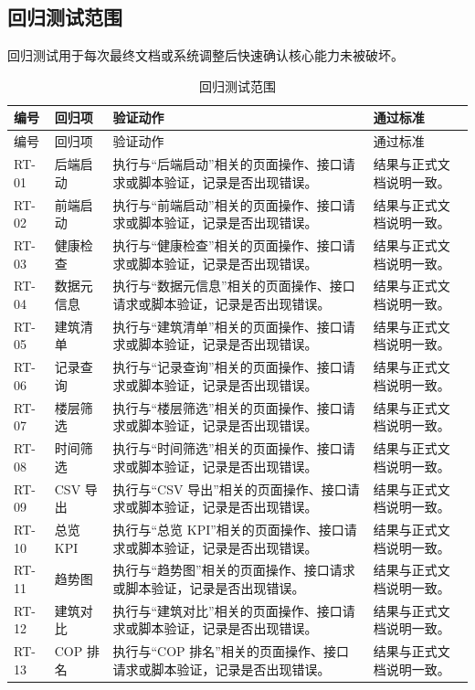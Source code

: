 \documentclass[12pt,a4paper]{ctexart}
\begin{document}
\subsection{回归测试范围}
回归测试用于每次最终文档或系统调整后快速确认核心能力未被破坏。
\begin{longtable}{L{1.8cm}L{3.2cm}L{6.4cm}L{4.0cm}}
\caption{回归测试范围}\\
\toprule
编号 & 回归项 & 验证动作 & 通过标准 \\
\midrule
\endfirsthead
\toprule
编号 & 回归项 & 验证动作 & 通过标准 \\
\midrule
\endhead
RT-01 & 后端启动 & 执行与“后端启动”相关的页面操作、接口请求或脚本验证，记录是否出现错误。 & 结果与正式文档说明一致。 \\
RT-02 & 前端启动 & 执行与“前端启动”相关的页面操作、接口请求或脚本验证，记录是否出现错误。 & 结果与正式文档说明一致。 \\
RT-03 & 健康检查 & 执行与“健康检查”相关的页面操作、接口请求或脚本验证，记录是否出现错误。 & 结果与正式文档说明一致。 \\
RT-04 & 数据元信息 & 执行与“数据元信息”相关的页面操作、接口请求或脚本验证，记录是否出现错误。 & 结果与正式文档说明一致。 \\
RT-05 & 建筑清单 & 执行与“建筑清单”相关的页面操作、接口请求或脚本验证，记录是否出现错误。 & 结果与正式文档说明一致。 \\
RT-06 & 记录查询 & 执行与“记录查询”相关的页面操作、接口请求或脚本验证，记录是否出现错误。 & 结果与正式文档说明一致。 \\
RT-07 & 楼层筛选 & 执行与“楼层筛选”相关的页面操作、接口请求或脚本验证，记录是否出现错误。 & 结果与正式文档说明一致。 \\
RT-08 & 时间筛选 & 执行与“时间筛选”相关的页面操作、接口请求或脚本验证，记录是否出现错误。 & 结果与正式文档说明一致。 \\
RT-09 & CSV 导出 & 执行与“CSV 导出”相关的页面操作、接口请求或脚本验证，记录是否出现错误。 & 结果与正式文档说明一致。 \\
RT-10 & 总览 KPI & 执行与“总览 KPI”相关的页面操作、接口请求或脚本验证，记录是否出现错误。 & 结果与正式文档说明一致。 \\
RT-11 & 趋势图 & 执行与“趋势图”相关的页面操作、接口请求或脚本验证，记录是否出现错误。 & 结果与正式文档说明一致。 \\
RT-12 & 建筑对比 & 执行与“建筑对比”相关的页面操作、接口请求或脚本验证，记录是否出现错误。 & 结果与正式文档说明一致。 \\
RT-13 & COP 排名 & 执行与“COP 排名”相关的页面操作、接口请求或脚本验证，记录是否出现错误。 & 结果与正式文档说明一致。 \\

\end{longtable}
\end{document}
